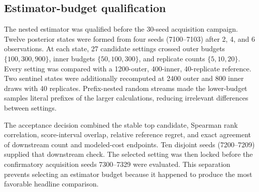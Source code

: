 \hypertarget{estimator-budget-qualification}{%
\subsection{Estimator-budget
qualification}\label{estimator-budget-qualification}}

The nested estimator was qualified before the 30-seed acquisition
campaign. Twelve posterior states were formed from four seeds
(7100--7103) after 2, 4, and 6 observations. At each state, 27 candidate
settings crossed outer budgets \(\{100,300,900\}\), inner budgets
\(\{50,100,300\}\), and replicate counts \(\{5,10,20\}\). Every setting
was compared with a 1200-outer, 400-inner, 40-replicate reference. Two
sentinel states were additionally recomputed at 2400 outer and 800 inner
draws with 40 replicates. Prefix-nested random streams made the
lower-budget samples literal prefixes of the larger calculations,
reducing irrelevant differences between settings.

The acceptance decision combined the stable top candidate, Spearman rank
correlation, score-interval overlap, relative reference regret, and
exact agreement of downstream count and modeled-cost endpoints. Ten
disjoint seeds (7200--7209) supplied that downstream check. The selected
setting was then locked before the confirmatory acquisition seeds
7300--7329 were evaluated. This separation prevents selecting an
estimator budget because it happened to produce the most favorable
headline comparison.


